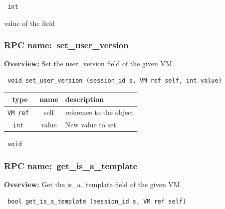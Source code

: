 \vspace{0.3cm}

{\tt 
int
}


value of the field
\vspace{0.3cm}
\vspace{0.3cm}
\vspace{0.3cm}
\subsubsection{RPC name:~set\_user\_version}

{\bf Overview:} 
Set the user\_version field of the given VM.

\begin{verbatim} void set_user_version (session_id s, VM ref self, int value)\end{verbatim}



 
\vspace{0.3cm}
\begin{tabular}{|c|c|p{7cm}|}
 \hline
{\bf type} & {\bf name} & {\bf description} \\ \hline
{\tt VM ref } & self & reference to the object \\ \hline 

{\tt int } & value & New value to set \\ \hline 

\end{tabular}

\vspace{0.3cm}

{\tt 
void
}



\vspace{0.3cm}
\vspace{0.3cm}
\vspace{0.3cm}
\subsubsection{RPC name:~get\_is\_a\_template}

{\bf Overview:} 
Get the is\_a\_template field of the given VM.

\begin{verbatim} bool get_is_a_template (session_id s, VM ref self)\end{verbatim}



